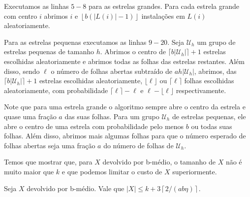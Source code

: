 Executamos as linhas $5-8$ para as estrelas grandes. Para cada estrela grande com centro $i$ abrimos $i$ e $\left \lfloor b (|L(i)| - 1) \right \rfloor$ instalações em $L(i)$ aleatoriamente.

Para as estrelas pequenas executamos as linhas $9-20$. Seja $\mathcal{U}_h$ um grupo de estrelas pequenas de tamanho $h$. Abrimos o centro de $\lceil b |\mathcal{U}_h| \rceil + 1$ estrelas escolhidas aleatoriamente e abrimos todas as folhas das estrelas restantes. Além disso, sendo $\ell$ o número de folhas abertas subtraído de $ah|\mathcal{U}_h|$, abrimos, das $\lceil b |\mathcal{U}_h| \rceil + 1$ estrelas escolhidas aleatoriamente, $\lfloor \ell \rfloor$ ou $\lceil \ell \rceil$ folhas escolhidas aleatoriamente, com probabilidade $\lceil \ell \rceil - \ell$ e $\ell - \lfloor \ell \rfloor$ respectivamente.

Note que para uma estrela grande o algoritmo sempre abre o centro da estrela e quase uma fração $a$ das suas folhas. Para um grupo $\mathcal{U}_h$ de estrelas pequenas, ele abre o centro de uma estrela com probabilidade pelo menos $b$ ou todas suas folhas. Além disso, abrimos mais algumas folhas para que o número esperado de folhas abertas seja uma fração $a$ do número de folhas de $\mathcal{U}_h$.

Temos que mostrar que, para $X$ devolvido por {\sc b-médio}, o tamanho de $X$ não é muito maior que $k$ e que podemos limitar o custo de $X$ superiormente.
\begin{lemma}
    Seja $X$ devolvido por {\sc b-médio}. Vale que 
    \(|X| \leq k + 3 \left \lceil 2/(ab\eta) \right \rceil\).
\end{lemma}

